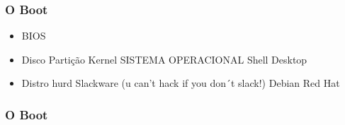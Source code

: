 \subsubsection[O Boot]{O Boot}

\begin{itemize}
	\item BIOS
	\item Disco
	\subitem Partição
	\subsubitem Kernel
	\subitem SISTEMA OPERACIONAL
	\subsubitem Shell
	\subitem Desktop
	\item Distro
	\subitem hurd
	\subitem Slackware (u can't hack if you don´t slack!)
	\subitem Debian
	\subitem Red Hat
\end{itemize}

\subsubsection[O Boot]{O Boot}

\vfill \null\pagebreak
